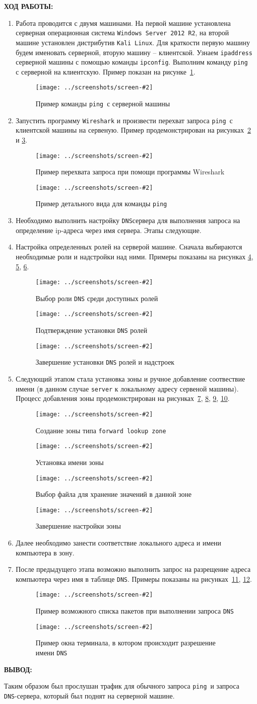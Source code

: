 \documentclass[14pt,a4paper]{extreport}
\newcommand{\screenshot}[2]{\begin{figure}[ht]%
\centering\texttt{[image: ../screenshots/screen-\#2]}%
\caption{#1}%
\label{picture#2}%
\end{figure}%
}
\newcommand{\header}[1]{%
{
\fontsize{16pt}{14pt}\selectfont
\begin{center}
\textbf{\MakeUppercase{#1}:}
\end{center}
}
}
\newcommand{\ping}{\texttt{ping }}
\newcommand{\dns}{\texttt{DNS}}
\begin{document}
\clearpage


\header{Ход работы}

\begin{enumerate}

\item Работа проводится с двумя машинами. На первой машине установлена серверная операционная система \verb|Windows Server 2012 R2|, на второй машине установлен дистрибутив \verb|Kali Linux|. Для краткости первую машину будем именовать серверной, вторую машину -- клиентской. Узнаем \verb|ipaddress| серверной машины с помощью команды \verb|ipconfig|. Выполним команду \ping с серверной на клиентскую. Пример показан на рисунке~\ref{picture1}.

\screenshot{Пример команды \ping с серверной машины}{1}

\item Запустить программу \texttt{Wireshark} и произвести перехват запроса \ping с клиентской машины на сервеную. Пример продемонстрирован на рисунках~\ref{picture2} и \ref{picture3}.

\screenshot{Пример перехвата запроса при помощи программы Wireshark}{2}

\screenshot{Пример детального вида для команды \ping}{3}

\item Необходимо выполнить настройку \dns сервера для выполнения запроса на определение ip-адреса через имя сервера. Этапы следующие.

\item Настройка определенных ролей на серверой машине. Сначала выбираются необходимые роли и надстройки над ними. Примеры показаны на рисунках \ref{picture4}, \ref{picture5}, \ref{picture6}.

\screenshot{Выбор роли \dns {} среди доступных ролей}{4}
\screenshot{Подтверждение установки \dns {} ролей}{5}
\screenshot{Завершение установки \dns {} ролей и надстроек}{6}

\item Следующий этапом стала установка зоны и ручное добавление соотвествие имени (в данном случае \texttt{server} к локальному адресу сервеной машины). Процесс добавления зоны продемонстрирован на рисунках~\ref{picture7}, \ref{picture8}, \ref{picture9}, \ref{picture10}.

\screenshot{Создание зоны типа \texttt{forward lookup zone}}{7}
\screenshot{Установка имени зоны}{8}
\screenshot{Выбор файла для хранение значений в данной зоне}{9}
\screenshot{Завершение настройки зоны}{10}

\item Далее необходимо занести соответствие локального адреса и имени компьютера в зону.

\item После предыдущего этапа возможно выполнить запрос на разрещение адреса компьютера через имя в таблице \dns . Примеры показаны на рисунках~\ref{picture11}, \ref{picture12}.

\screenshot{Пример возможного списка пакетов при выполнении запроса \dns}{11}
\screenshot{Пример окна терминала, в котором происходит разрешение имени \dns}{12}

\end{enumerate}

\clearpage

\header{Вывод}

Таким образом был прослушан трафик для обычного запроса \ping и запроса \dns {}-сервера, который был поднят на серверной машине.
\end{document}
